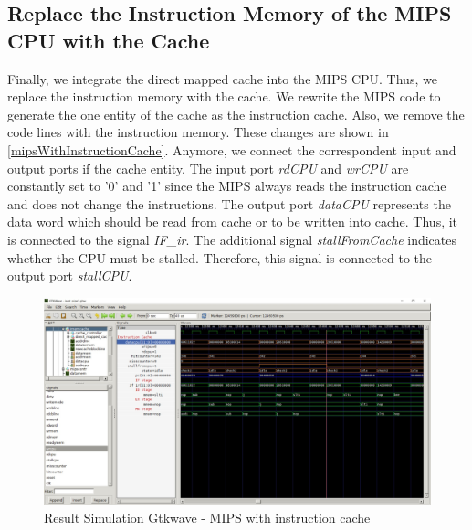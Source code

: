 \subsection{Replace the Instruction Memory of the MIPS CPU with the Cache}
\label{sec:replaceInstructionMemory}
Finally, we integrate the direct mapped cache into the MIPS CPU. Thus, we replace the instruction memory with the cache. We rewrite the MIPS code to generate the one entity of the cache as the instruction cache. Also, we remove the code lines with the instruction memory. These changes are shown in \ref{mipsWithInstructionCache}. Anymore, we connect the correspondent input and output ports if the cache entity. The input port \textit{rdCPU} and \textit{wrCPU} are constantly set to '0' and '1' since the MIPS always reads the instruction cache and does not change the instructions. The output port \textit{dataCPU} represents the data word which should be read from cache or to be written into cache. Thus, it is connected to the signal \textit{IF\_ir}. The additional signal \textit{stallFromCache} indicates whether the CPU must be stalled. Therefore, this signal is connected to the output port \textit{stallCPU}.
\begin{figure}
	\centering
	\includegraphics[scale=.4]{pictures/gtkwave_result_mipsWithInstructionCache}
	\caption{Result Simulation Gtkwave - MIPS with instruction cache}
	\label{fig:mipsWithInstrCache}
\end{figure}




